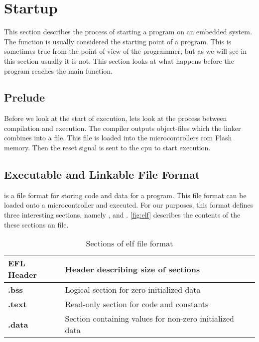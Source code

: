\section{Startup}
\label{sec:back:startup}

This section describes the process of starting a program on an embedded system.
The \main function is usually considered the starting point of a program.
This is sometimes true from the point of view of the programmer, but as we will see in this section usually it is not.
This section looks at what happens before the program reaches the main function.

\subsection{Prelude}

Before we look at the start of execution, lets look at the process between compilation and execution.
The compiler outputs object-files which the linker combines into a \elf file.
This file is loaded into the microcontrollers \gls{rom} Flash memory.
Then the reset signal is sent to the \gls{cpu} to start execution.

\subsection{Executable and Linkable File Format}
\elf is a file format for storing code and data for a program.
This file format can be loaded onto a microcontroller and executed.
For our purposes, this format defines three interesting sections, namely ,  and .
\autoref{fig:elf} describes the contents of the these sections an \elf file.

\begin{table}[H]
  \centering
  \begin{tabular}{|l|l|}
    \hline
    EFL Header & Header describing size of sections \\
    \hline
    \textbf{.bss} & Logical section for zero-initialized data \\
    \hline
    \textbf{.text} & Read-only section for code and constants \\
    \hline
    \textbf{.data} & Section containing values for non-zero initialized data \\
    \hline
  \end{tabular}
  \caption{Sections of elf file format}
  \label{fig:elf}
\end{table}

